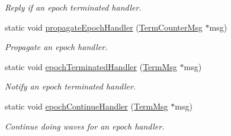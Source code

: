 \begin{DoxyCompactItemize}
\begin{DoxyCompactList}\small\item\em Reply if an epoch terminated handler. \end{DoxyCompactList}\item 
static void \hyperlink{structvt_1_1term_1_1_termination_detector_a75c8f7279bbd48daec2ddc7ee0f0b7b3}{propagate\+Epoch\+Handler} (\hyperlink{structvt_1_1term_1_1_term_counter_msg}{Term\+Counter\+Msg} $\ast$msg)
\begin{DoxyCompactList}\small\item\em Propagate an epoch handler. \end{DoxyCompactList}\item 
static void \hyperlink{structvt_1_1term_1_1_termination_detector_af1429c4e6d684bc0487f1b4a6d6bbf43}{epoch\+Terminated\+Handler} (\hyperlink{structvt_1_1term_1_1_term_msg}{Term\+Msg} $\ast$msg)
\begin{DoxyCompactList}\small\item\em Notify an epoch terminated handler. \end{DoxyCompactList}\item 
static void \hyperlink{structvt_1_1term_1_1_termination_detector_a5791344ef9d163fa9cb17b136ca68549}{epoch\+Continue\+Handler} (\hyperlink{structvt_1_1term_1_1_term_msg}{Term\+Msg} $\ast$msg)
\begin{DoxyCompactList}\small\item\em Continue doing waves for an epoch handler. \end{DoxyCompactList}\end{DoxyCompactItemize}
